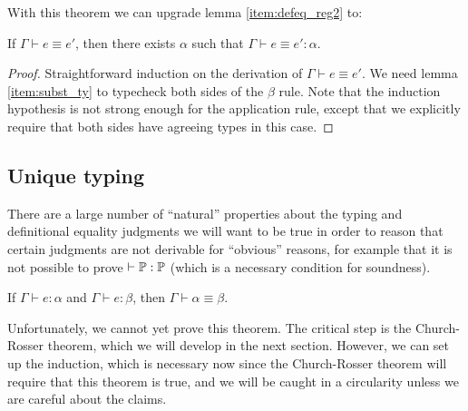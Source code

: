 With this theorem we can upgrade lemma \ref{item:defeq_reg2} to:
\begin{lemma}
\begin{thmlist}
\item If $\Gamma\vdash e\equiv e'$, then there exists $\alpha$ such that $\Gamma\vdash e\equiv e':\alpha$.
\end{thmlist}
\end{lemma}
\begin{proof}
Straightforward induction on the derivation of $\Gamma\vdash e\equiv e'$. We need lemma \ref{item:subst_ty} to typecheck both sides of the $\beta$ rule. Note that the induction hypothesis is not strong enough for the application rule, except that we explicitly require that both sides have agreeing types in this case.
\end{proof}

\subsection{Unique typing}\label{sec:unique}
There are a large number of ``natural'' properties about the typing and definitional equality judgments we will want to be true in order to reason that certain judgments are not derivable for ``obvious'' reasons, for example that it is not possible to prove $\vdash\P:\P$ (which is a necessary condition for soundness).

\begin{theorem}\label{thm:unique}
If $\Gamma\vdash e:\alpha$ and $\Gamma\vdash e:\beta$, then $\Gamma\vdash\alpha\equiv\beta$.
\end{theorem}

Unfortunately, we cannot yet prove this theorem. The critical step is the Church-Rosser theorem, which we will develop in the next section. However, we can set up the induction, which is necessary now since the Church-Rosser theorem will require that this theorem is true, and we will be caught in a circularity unless we are careful about the claims.

